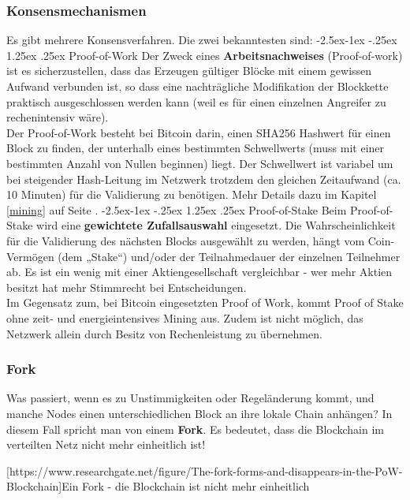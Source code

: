 \documentclass[10pt,a4paper,titlepage]{paper}
\makeatletter
\renewcommand\paragraph{\@startsection{paragraph}{4}{\z@}%
            {-2.5ex\@plus -1ex \@minus -.25ex}%
            {1.25ex \@plus .25ex}%
            {\normalfont\normalsize\bfseries}}
\makeatother
\begin{document}
\subsubsection{Konsensmechanismen}
Es gibt mehrere Konsensverfahren. Die zwei bekanntesten sind:
\paragraph{Proof-of-Work}
Der Zweck eines \textbf{Arbeitsnachweises} (Proof-of-work) ist es sicherzustellen, dass das Erzeugen gültiger Blöcke mit einem gewissen Aufwand verbunden ist, so dass eine nachträgliche Modifikation der Blockkette praktisch ausgeschlossen werden kann (weil es für einen einzelnen Angreifer zu rechenintensiv wäre).\\
Der Proof-of-Work besteht bei Bitcoin darin, einen SHA256 Hashwert für einen Block zu finden, der unterhalb eines bestimmten Schwellwerts (muss mit einer bestimmten Anzahl von Nullen beginnen) liegt. Der Schwellwert ist variabel um bei steigender Hash-Leitung im Netzwerk trotzdem den gleichen Zeitaufwand (ca. 10 Minuten) für die Validierung zu benötigen. Mehr Details dazu im Kapitel \ref{mining} auf Seite \pageref{mining}.
\paragraph{Proof-of-Stake}
Beim Proof-of-Stake wird eine \textbf{gewichtete Zufallsauswahl} eingesetzt. Die Wahrscheinlichkeit für die Validierung des nächsten Blocks ausgewählt zu werden, hängt vom Coin-Vermögen (dem „Stake“) und/oder der Teilnahmedauer der einzelnen Teilnehmer ab.  Es ist ein wenig mit einer Aktiengesellschaft vergleichbar - wer mehr Aktien besitzt hat mehr Stimmrecht bei Entscheidungen.\\Im Gegensatz zum, bei Bitcoin eingesetzten Proof of Work, kommt Proof of Stake ohne zeit- und energieintensives Mining aus. Zudem ist nicht möglich, das Netzwerk allein durch Besitz von Rechenleistung zu übernehmen.


\subsubsection{Fork}
Was passiert, wenn es zu Unstimmigkeiten oder Regeländerung kommt, und manche Nodes einen unterschiedlichen Block an ihre lokale Chain anhängen? In diesem Fall spricht man von einem \textbf{Fork}. Es bedeutet, dass die Blockchain im verteilten Netz nicht mehr einheitlich ist!
\begin{center}
[https://www.researchgate.net/figure/The-fork-forms-and-disappears-in-the-PoW-Blockchain]{Ein Fork - die Blockchain ist nicht mehr einheitlich}
\end{center}
\end{document}
